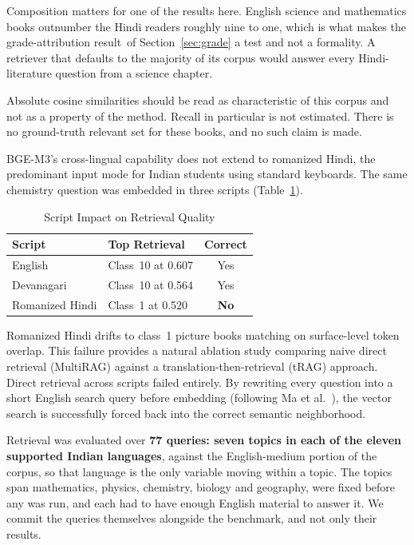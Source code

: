 Composition matters for one of the results here. English science and mathematics books outnumber the Hindi readers roughly nine to one, which is what makes the grade-attribution result\ifconf\else\ of Section~\ref{sec:grade}\fi{} a test and not a formality. A retriever that defaults to the majority of its corpus would answer every Hindi-literature question from a science chapter.

Absolute cosine similarities should be read as characteristic of this corpus and not as a property of the method. Recall in particular is not estimated. There is no ground-truth relevant set for these books, and no such claim is made.

\ifconf\else  %
\label{sec:romanized}
BGE-M3's cross-lingual capability does not extend to romanized Hindi, the predominant input mode for Indian students using standard keyboards. The same chemistry question was embedded in three scripts (Table~\ref{tab:scripts}).

\begin{table}
\caption{Script Impact on Retrieval Quality}
\label{tab:scripts}
\centering
\begin{tabular}{@{}llc@{}}
\toprule
\textbf{Script} & \textbf{Top Retrieval} & \textbf{Correct} \\
\midrule
English & Class~10 at 0.607 & Yes \\
Devanagari & Class~10 at 0.564 & Yes \\
Romanized Hindi & Class~1 at 0.520 & \textbf{No} \\
\bottomrule
\end{tabular}
\end{table}

Romanized Hindi drifts to class~1 picture books matching on surface-level token overlap. This failure provides a natural ablation study comparing naive direct retrieval (MultiRAG) against a translation-then-retrieval (tRAG) approach. Direct retrieval across scripts failed entirely. By rewriting every question into a short English search query before embedding (following Ma et al.~\cite{b4}), the vector search is successfully forced back into the correct semantic neighborhood.
\fi

\label{sec:crossling}
Retrieval was evaluated over \textbf{77 queries: seven topics in each of the eleven supported Indian languages}, against the English-medium portion of the corpus, so that language is the only variable moving within a topic. The topics span mathematics, physics, chemistry, biology and geography, were fixed before any was run, and each had to have enough English material to answer it. We commit the queries themselves alongside the benchmark, and not only their results.

